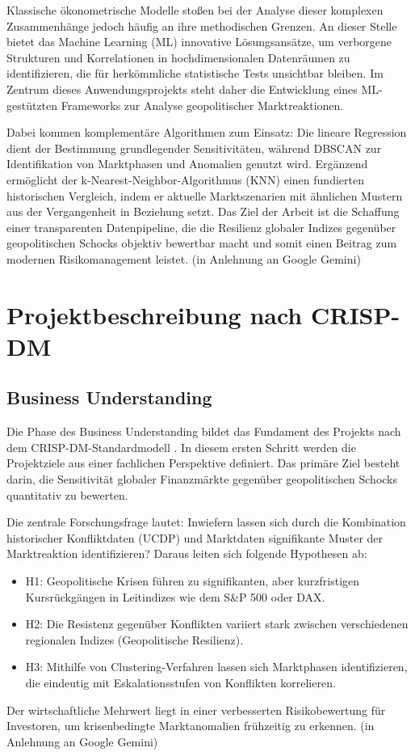 \documentclass[12pt,a4paper]{article}
\begin{document}
Klassische ökonometrische Modelle stoßen bei der Analyse dieser komplexen Zusammenhänge jedoch häufig an ihre methodischen Grenzen. An dieser Stelle bietet das Machine Learning (ML) innovative Lösungsansätze, um verborgene Strukturen und Korrelationen in hochdimensionalen Datenräumen zu identifizieren, die für herkömmliche statistische Tests unsichtbar bleiben. Im Zentrum dieses Anwendungsprojekts steht daher die Entwicklung eines ML-gestützten Frameworks zur Analyse geopolitischer Marktreaktionen.

Dabei kommen komplementäre Algorithmen zum Einsatz: Die lineare Regression dient der Bestimmung grundlegender Sensitivitäten, während DBSCAN zur Identifikation von Marktphasen und Anomalien genutzt wird. Ergänzend ermöglicht der k-Nearest-Neighbor-Algorithmus (KNN) einen fundierten historischen Vergleich, indem er aktuelle Marktszenarien mit ähnlichen Mustern aus der Vergangenheit in Beziehung setzt. Das Ziel der Arbeit ist die Schaffung einer transparenten Datenpipeline, die die Resilienz globaler Indizes gegenüber geopolitischen Schocks objektiv bewertbar macht und somit einen Beitrag zum modernen Risikomanagement leistet. (in Anlehnung an Google Gemini)

\section{Projektbeschreibung nach CRISP-DM}

\subsection{Business Understanding}
Die Phase des Business Understanding bildet das Fundament des Projekts nach dem CRISP-DM-Standardmodell \parencite{wirth2000crisp}. In diesem ersten Schritt werden die Projektziele aus einer fachlichen Perspektive definiert. Das primäre Ziel besteht darin, die Sensitivität globaler Finanzmärkte gegenüber geopolitischen Schocks quantitativ zu bewerten. 

Die zentrale Forschungsfrage lautet: Inwiefern lassen sich durch die Kombination historischer Konfliktdaten (UCDP) und Marktdaten signifikante Muster der Marktreaktion identifizieren?
Daraus leiten sich folgende Hypothesen ab:
\begin{itemize}
    \item H1: Geopolitische Krisen führen zu signifikanten, aber kurzfristigen Kursrückgängen in Leitindizes wie dem S\&P 500 oder DAX.
    \item H2: Die Resistenz gegenüber Konflikten variiert stark zwischen verschiedenen regionalen Indizes (Geopolitische Resilienz).
    \item H3: Mithilfe von Clustering-Verfahren lassen sich Marktphasen identifizieren, die eindeutig mit Eskalationsstufen von Konflikten korrelieren.
\end{itemize}
Der wirtschaftliche Mehrwert liegt in einer verbesserten Risikobewertung für Investoren, um krisenbedingte Marktanomalien frühzeitig zu erkennen. (in Anlehnung an Google Gemini)
\end{document}
